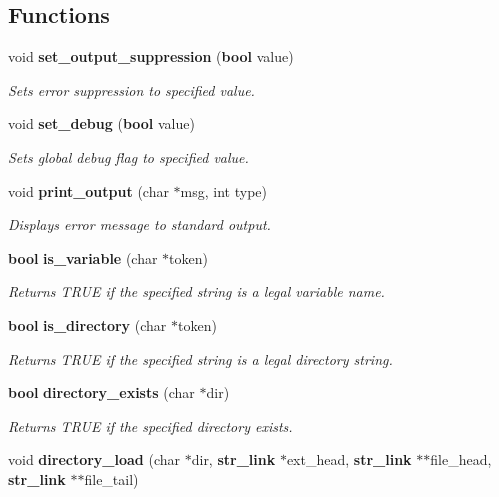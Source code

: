 \subsection*{Functions}
\begin{CompactItemize}
\item 
void {\bf set\_\-output\_\-suppression} ({\bf bool} value)
\begin{CompactList}\small\item\em Sets error suppression to specified value.\item\end{CompactList}\item 
void {\bf set\_\-debug} ({\bf bool} value)
\begin{CompactList}\small\item\em Sets global debug flag to specified value.\item\end{CompactList}\item 
void {\bf print\_\-output} (char $\ast$msg, int type)
\begin{CompactList}\small\item\em Displays error message to standard output.\item\end{CompactList}\item 
{\bf bool} {\bf is\_\-variable} (char $\ast$token)
\begin{CompactList}\small\item\em Returns TRUE if the specified string is a legal variable name.\item\end{CompactList}\item 
{\bf bool} {\bf is\_\-directory} (char $\ast$token)
\begin{CompactList}\small\item\em Returns TRUE if the specified string is a legal directory string.\item\end{CompactList}\item 
{\bf bool} {\bf directory\_\-exists} (char $\ast$dir)
\begin{CompactList}\small\item\em Returns TRUE if the specified directory exists.\item\end{CompactList}\item 
void {\bf directory\_\-load} (char $\ast$dir, {\bf str\_\-link} $\ast$ext\_\-head, {\bf str\_\-link} $\ast$$\ast$file\_\-head, {\bf str\_\-link} $\ast$$\ast$file\_\-tail)

\end{CompactItemize}
